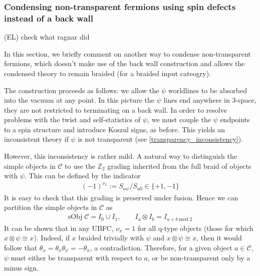 \documentclass[12pt,a4paper]{article}
\newcommand{\tp}{\otimes}
\newcommand{\mcc}{\mathcal{C}}
\newcommand{\ethan}[1]{{\color{amethyst}\footnotesize{(EL) #1}}}
\newcommand{\kw}[1]{{\color{kwcolor}\footnotesize{(KW) #1}}}
\begin{document}
\subsubsection{Condensing non-transparent fermions using spin defects instead of a back wall} \label{spin_defects_condensation}

\ethan{check what ragnar did}

In this section, we briefly comment on another way to condense non-transparent fermions, 
which doesn't make use of the back wall construction and allows the condensed theory to remain braided 
(for a braided input cateogry). 

The construction proceeds as follows: we allow the $\psi$ worldlines to be absorbed into the vacuum at any point.
In this picture the $\psi$ lines end anywhere in 3-space, they are not restricted to terminating on a back wall. 
In order to resolve problems with the twist and self-statistics of $\psi$, 
we must couple the $\psi$ endpoints to a spin structure and introduce Koszul signs, as before.
This yields an inconsistent theory if $\psi$ is not transparent (see \eqref{transparency_inconsistency}).

However, this inconsistency is rather mild. 
A natural way to distinguish the simple objects in $\mcc$ to use the $\mathbb{Z}_2$ 
grading inherited from the full braid of objects with $\psi$. 
This can be defined by the indicator 
\begin{align}
(-1)^{\nu_x} := S_{a \psi}/S_{a0} \in \{+1, -1 \}
\label{grading}
\end{align}
It is easy to check that this grading is preserved under fusion.
Hence we can partition the simple objects in $\mcc$ as 
\begin{align} \label{braiding_indicator}
\text{sObj}\; \mathcal{C}  = I_0 \cup I_1, \quad \quad I_a \tp I_b = I_{a+b\; \text{mod} \; 2}
\end{align}
It can be shown that in any UBFC, $\nu_x = 1$ for all q-type objects (those for which $x\tp \psi \cong x$).
Indeed, if $x$ braided trivially with $\psi$ and $x\tp \psi \cong x$, then it would follow that
$\theta_x = \theta_x \theta_\psi = -\theta_x$, a contradiction.
Therefore, for a given object $a\in\mcc$, $\psi$ must either be transparent with respect to $a$, or be non-transparent only by a minus sign. 
\end{document}
